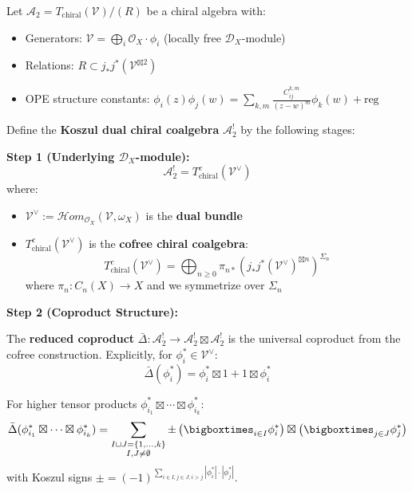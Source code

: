 \begin{definition}
\label{def:intrinsic-koszul-dual}

Let $\mathcal{A}_2 = T_{\text{chiral}}(\mathcal{V})/(R)$ be a chiral algebra with:
\begin{itemize}
\item Generators: $\mathcal{V} = \bigoplus_{i} \mathcal{O}_X \cdot \phi_i$ (locally free $\mathcal{D}_X$-module)
\item Relations: $R \subset j_*j^*(\mathcal{V}^{\boxtimes 2})$ 
\item OPE structure constants: $\phi_i(z)\phi_j(w) = \sum_{k,m} \frac{C_{ij}^{k,m}}{(z-w)^m} \phi_k(w) + \text{reg}$
\end{itemize}

Define the \textbf{Koszul dual chiral coalgebra} $\mathcal{A}_2^!$ by the following stages:

\medskip
\noindent\textbf{Step 1 (Underlying $\mathcal{D}_X$-module):}
$$\mathcal{A}_2^! = T^c_{\text{chiral}}(\mathcal{V}^{\vee})$$
where:
\begin{itemize}
\item $\mathcal{V}^{\vee} := \mathcal{H}om_{\mathcal{O}_X}(\mathcal{V}, \omega_X)$ is the \textbf{dual bundle}
\item $T^c_{\text{chiral}}(\mathcal{V}^{\vee})$ is the \textbf{cofree chiral coalgebra}:
$$T^c_{\text{chiral}}(\mathcal{V}^{\vee}) = \bigoplus_{n \geq 0} \pi_{n*}\left(j_*j^*(\mathcal{V}^{\vee})^{\boxtimes n}\right)^{\Sigma_n}$$
where $\pi_n: C_n(X) \to X$ and we symmetrize over $\Sigma_n$
\end{itemize}

\medskip
\noindent\textbf{Step 2 (Coproduct Structure):}

The \textbf{reduced coproduct} $\bar{\Delta}: \mathcal{A}_2^! \to \mathcal{A}_2^! \boxtimes \mathcal{A}_2^!$ is the universal coproduct from the cofree construction. Explicitly, for $\phi_i^* \in \mathcal{V}^{\vee}$:
$$\bar{\Delta}(\phi_i^*) = \phi_i^* \boxtimes 1 + 1 \boxtimes \phi_i^*$$

For higher tensor products $\phi_{i_1}^* \boxtimes \cdots \boxtimes \phi_{i_k}^*$:
$$\bar{\Delta}(\phi_{i_1}^* \boxtimes \cdots \boxtimes \phi_{i_k}^*) = \sum_{\substack{I \sqcup J = \{1,\ldots,k\} \\ I, J \neq \emptyset}} \pm \left(\bigboxtimes_{i \in I} \phi_i^*\right) \boxtimes \left(\bigboxtimes_{j \in J} \phi_j^*\right)$$
with Koszul signs $\pm = (-1)^{\sum_{i \in I, j \in J, i > j} |\phi_i^*| \cdot |\phi_j^*|}$.


\end{definition}

